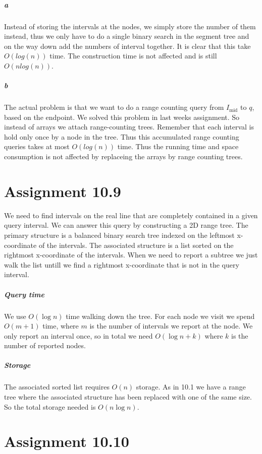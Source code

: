\documentclass[10pt,a4paper,final,oneside,openany,article,oldfontcommands]{memoir}
\begin{document}
\paragraph{a} Instead of storing the intervals at the nodes, we simply store
the number of them instead, thus we only have to do a single binary search in
the segment tree and on the way down add the numbers of interval together. It
is clear that this take $O(log(n))$ time. The construction time is not
affected and is still $O(nlog(n))$.

\paragraph{b} The actual problem is that we want to do a range counting query
from $I_\textrm{mid}$ to $q$, based on the endpoint. We solved this problem in
last weeks assignment. So instead of arrays we attach range-counting trees.
Remember that each interval is hold only once by a node in the tree. Thus this
accumulated range counting queries takes at most $O(log(n))$ time. Thus the
running time and space consumption is not affected by replaceing the arrays by
range counting trees.

\chapter*{Assignment 10.9}
We need to find intervals on the real line that are completely contained in a given query interval. We can answer this query by constructing a 2D range tree. The primary structure is a balanced binary search tree indexed on the leftmost x-coordinate of the intervals. The associated structure is a list sorted on the rightmost x-coordinate of the intervals. When we need to report a subtree we just walk the list untill we find a rightmost x-coordinate that is not in the query interval.

\paragraph{Query time}
We use $O(\log n)$ time walking down the tree. For each node we visit we spend $O(m + 1)$ time, where $m$ is the number of intervals we report at the node. We only report an interval once, so in total we need $O(\log n + k)$ where $k$ is the number of reported nodes.

\paragraph{Storage}
The associated sorted list requires $O(n)$ storage. As in 10.1 we have a range tree where the associated structure has been replaced with one of the same size. So the total storage needed is $O(n \log n)$.


\chapter*{Assignment 10.10}

\printbibliography
\end{document}
